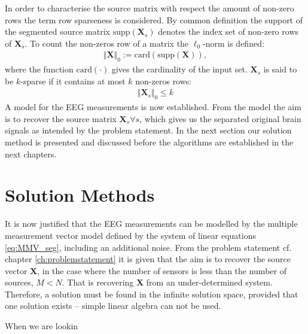 In order to characterise the source matrix with respect the amount of non-zero rows the term row sparseness is considered.  
By common definition the support of the segmented source matrix $\text{supp}(\mathbf{X}_s)$ denotes the index set of non-zero rows of $\mathbf{X}_s$.
To count the non-zeros row of a matrix the $\ell_0$-norm is defined:
\begin{align*}
\Vert \mathbf{X} \Vert_0 := \text{card}(\text{supp}(\mathbf{X})),
\end{align*}
where the function $\text{card}(\cdot)$ gives the cardinality of the input set. 
$\textbf{X}_s$ is said to be $k$-sparse if it contains at most $k$ non-zeros rows:
\begin{align*}
\Vert \mathbf{X}_s \Vert_0 \leq k
\end{align*}
A model for the EEG measurements is now established.
From the model the aim is to recover the source matrix $\textbf{X}_s \forall s$, which gives us the separated original brain signals as intended by the problem statement.      
In the next section our solution method is presented and discussed before the algorithms are established in the next chapters.    

\section{Solution Methods}\label{sec:sol_met}
It is now justified that the EEG measurements can be modelled by the multiple measurement vector model defined by the system of linear equations \eqref{eq:MMV_seg}, including an additional noise.
From the problem statement cf. chapter \ref{ch:problemstatement} it is given that the aim is to recover the source vector $\textbf{X}$, in the case where the number of sensors is less than the number of sources, $M < N$. That is recovering $\textbf{X}$ from an under-determined system. Therefore, a solution must be found in the infinite solution space, provided that one solution exists -- simple linear algebra can not be used.

When we are lookin


       


